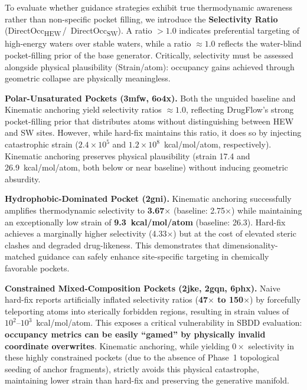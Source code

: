 \documentclass{article}
\begin{document}
To evaluate whether guidance strategies exhibit true thermodynamic
awareness rather than non-specific pocket filling, we introduce the
\textbf{Selectivity Ratio} (DirectOcc\textsubscript{HEW}\,/\,
DirectOcc\textsubscript{SW}).  A ratio $> 1.0$ indicates preferential
targeting of high-energy waters over stable waters, while a ratio
$\approx 1.0$ reflects the water-blind pocket-filling prior of the base
generator.  Critically, selectivity must be assessed alongside physical
plausibility (Strain/atom): occupancy gains achieved through geometric
collapse are physically meaningless.

\textbf{Polar-Unsaturated Pockets (3mfw, 6o4x).}
Both the unguided baseline and Kinematic anchoring yield selectivity
ratios $\approx 1.0$, reflecting DrugFlow's strong pocket-filling prior
that distributes atoms without distinguishing between HEW and SW sites.
However, while hard-fix maintains this ratio, it does so by injecting
catastrophic strain ($2.4\times10^5$ and $1.2\times10^8$~kcal/mol/atom,
respectively).  Kinematic anchoring preserves physical plausibility
(strain 17.4 and 26.9~kcal/mol/atom, both below or near baseline) without
inducing geometric absurdity.

\textbf{Hydrophobic-Dominated Pocket (2gni).}
Kinematic anchoring successfully amplifies thermodynamic selectivity to
\textbf{3.67$\times$} (baseline: 2.75$\times$) while maintaining an
exceptionally low strain of \textbf{9.3~kcal/mol/atom} (baseline: 26.3).
Hard-fix achieves a marginally higher selectivity (4.33$\times$) but
at the cost of elevated steric clashes and degraded drug-likeness.
This demonstrates that dimensionality-matched guidance can safely enhance
site-specific targeting in chemically favorable pockets.

\textbf{Constrained Mixed-Composition Pockets (2jke, 2gqn, 6phx).}
Naive hard-fix reports artificially inflated selectivity ratios
(\textbf{47$\times$ to 150$\times$}) by forcefully teleporting atoms
into sterically forbidden regions, resulting in strain values of
$10^2$--$10^3$~kcal/mol/atom.  This exposes a critical vulnerability
in SBDD evaluation: \textbf{occupancy metrics can be easily ``gamed'' by
physically invalid coordinate overwrites}.  Kinematic anchoring, while
yielding $0\times$ selectivity in these highly constrained pockets
(due to the absence of Phase~1 topological seeding of anchor fragments),
strictly avoids this physical catastrophe, maintaining lower strain
than hard-fix and preserving the generative manifold.
\end{document}
